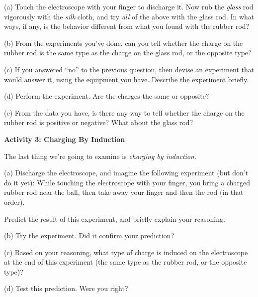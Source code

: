 (a) Touch the electroscope with your finger to discharge it. Now rub the \textit{glass}
rod vigorously with the \textit{silk} cloth, and try \textit{all} of the 
above with the glass rod. In what ways, if any, is the behavior different
from what you found with the rubber rod?

\answerspace{1.8in}

(b) From the experiments you've done, can you tell whether the charge on
the rubber rod is the same type as the charge on the glass rod, or
the opposite type?

\answerspace{1in}

(c) If you answered ``no'' to the previous question, then devise an experiment
that would answer it, using the equipment you have. Describe 
the experiment briefly.

\answerspace{2in}

(d) Perform the experiment. Are the charges the same or opposite?

\answerspace{1in}

(e) From the data you have, is there any way to tell whether the charge
on the rubber rod is positive or negative? What about the glass rod?

\answerspace{1in}

\pagebreak[2]
\textbf{Activity 3: Charging By Induction}

The last thing we're going to examine is \textit{charging by induction}.

(a) Discharge the electroscope, and imagine the following experiment (but don't do it yet):
While touching the electroscope
with your finger, you bring a charged rubber rod near the ball, then
take away your finger and then the rod (in that order).

Predict the result of this experiment, and briefly explain your reasoning.

\answerspace{2in}

(b) Try the experiment. Did it confirm your prediction?

\answerspace{1in}

(c) Based on your reasoning, what type of charge is induced on the electroscope
at the end of this experiment (the same type as the rubber rod,
or the opposite type)?

\answerspace{1in}

(d) Test this prediction. Were you right?


